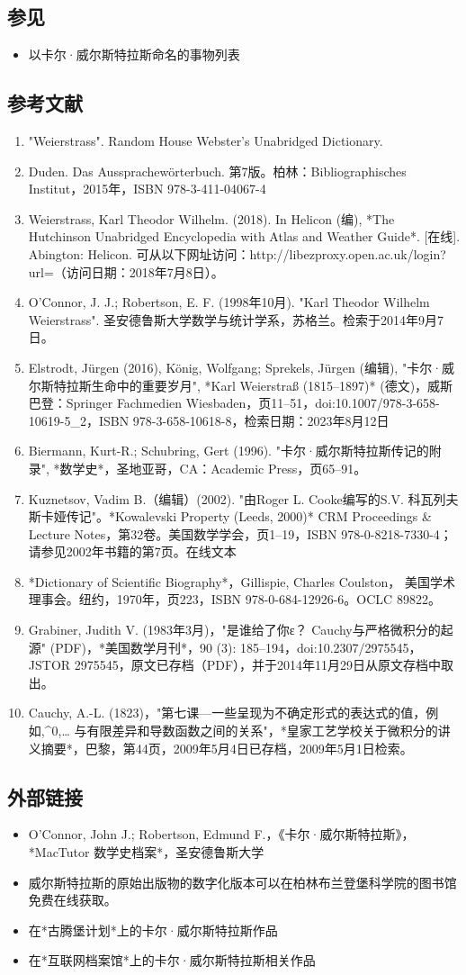 \subsection{参见}  
\begin{itemize}
\item 以卡尔·威尔斯特拉斯命名的事物列表
\end{itemize}
\subsection{参考文献}  
\begin{enumerate}
\item "Weierstrass". Random House Webster's Unabridged Dictionary.  
\item Duden. Das Aussprachewörterbuch. 第7版。柏林：Bibliographisches Institut，2015年，ISBN 978-3-411-04067-4  
\item Weierstrass, Karl Theodor Wilhelm. (2018). In Helicon (编), *The Hutchinson Unabridged Encyclopedia with Atlas and Weather Guide*. [在线]. Abington: Helicon. 可从以下网址访问：http://libezproxy.open.ac.uk/login?url=（访问日期：2018年7月8日）。  
\item O'Connor, J. J.; Robertson, E. F. (1998年10月). "Karl Theodor Wilhelm Weierstrass". 圣安德鲁斯大学数学与统计学系，苏格兰。检索于2014年9月7日。  
\item Elstrodt, Jürgen (2016), König, Wolfgang; Sprekels, Jürgen (编辑), "卡尔·威尔斯特拉斯生命中的重要岁月", *Karl Weierstraß (1815–1897)* (德文)，威斯巴登：Springer Fachmedien Wiesbaden，页11–51，doi:10.1007/978-3-658-10619-5_2，ISBN 978-3-658-10618-8，检索日期：2023年8月12日  
\item Biermann, Kurt-R.; Schubring, Gert (1996). "卡尔·威尔斯特拉斯传记的附录", *数学史*，圣地亚哥，CA：Academic Press，页65–91。  
\item Kuznetsov, Vadim B.（编辑）(2002). "由Roger L. Cooke编写的S.V. 科瓦列夫斯卡娅传记"。*Kowalevski Property (Leeds, 2000)* CRM Proceedings & Lecture Notes，第32卷。美国数学学会，页1–19，ISBN 978-0-8218-7330-4；请参见2002年书籍的第7页。在线文本  
\item *Dictionary of Scientific Biography*，Gillispie, Charles Coulston， 美国学术理事会。纽约，1970年，页223，ISBN 978-0-684-12926-6。OCLC 89822。  
\item Grabiner, Judith V. (1983年3月)，"是谁给了你ε？ Cauchy与严格微积分的起源" (PDF)，*美国数学月刊*，90 (3): 185–194，doi:10.2307/2975545，JSTOR 2975545，原文已存档（PDF），并于2014年11月29日从原文存档中取出。  
\item Cauchy, A.-L. (1823)，"第七课—一些呈现为不确定形式的表达式的值，例如{\displaystyle {\frac {\infty }{\infty }},\infty ^{0},\ldots } 与有限差异和导数函数之间的关系"，*皇家工艺学校关于微积分的讲义摘要*，巴黎，第44页，2009年5月4日已存档，2009年5月1日检索。
\end{enumerate}
\subsection{外部链接}
\begin{itemize}
\item O'Connor, John J.; Robertson, Edmund F.，《卡尔·威尔斯特拉斯》，*MacTutor 数学史档案*，圣安德鲁斯大学  
\item 威尔斯特拉斯的原始出版物的数字化版本可以在柏林布兰登堡科学院的图书馆免费在线获取。  
\item 在*古腾堡计划*上的卡尔·威尔斯特拉斯作品  
\item 在*互联网档案馆*上的卡尔·威尔斯特拉斯相关作品
\end{itemize}